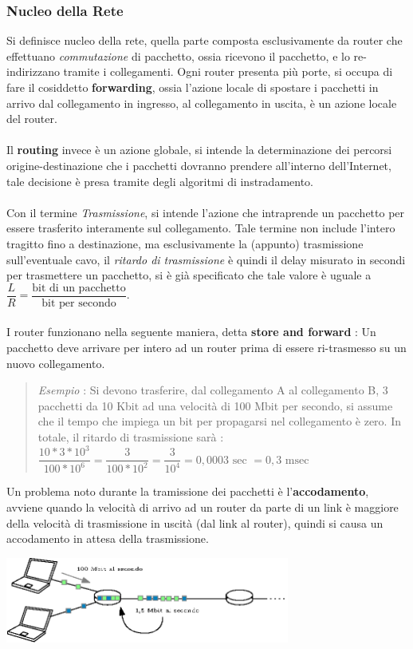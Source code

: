 \documentclass[12pt, letterpaper]{article}
\newcommand{\acc}{\\\hphantom{}\\}
\begin{document}
\subsubsection{Nucleo della Rete} \label{NucleoRete}
Si definisce nucleo della rete, quella parte composta esclusivamente da router  che effettuano \textit{commutazione} di pacchetto, ossia
ricevono il pacchetto, e lo re-indirizzano tramite i collegamenti. Ogni router presenta più porte, si occupa di fare il
cosiddetto \textbf{forwarding}, ossia l'azione locale di spostare i pacchetti in arrivo dal collegamento in ingresso, al collegamento
in uscita, è un azione locale del router.\acc
Il \textbf{routing} invece è un azione globale, si intende la determinazione dei percorsi origine-destinazione che i pacchetti
dovranno prendere all'interno dell'Internet, tale decisione è presa tramite degli algoritmi di instradamento.\acc
Con il termine \textit{Trasmissione}, si intende l'azione che intraprende un pacchetto per essere trasferito interamente
sul collegamento. Tale termine non include l'intero tragitto fino a destinazione, ma esclusivamente la (appunto) trasmissione sull'eventuale
cavo, il \textit{ritardo di trasmissione} è quindi il delay misurato in secondi per trasmettere un pacchetto, si è già specificato che tale
valore è uguale a $\dfrac{L}{R}=\dfrac{\text{bit di un pacchetto}}{\text{bit per secondo}}$.\acc
I router funzionano nella seguente maniera, detta \textbf{store and forward} : Un pacchetto deve arrivare per intero ad un router
prima di essere ri-trasmesso su un nuovo collegamento.\begin{quote}
    \color{gray} \textit{Esempio} : Si devono trasferire, dal collegamento A al collegamento B, 3 pacchetti da 10 Kbit ad una
    velocità di 100 Mbit per secondo, si assume che il  tempo che impiega un bit per propagarsi nel collegamento è zero.
    In totale, il ritardo di trasmissione sarà : $\dfrac{10*3*10^3}{100*10^6}=\dfrac{3}{100*10^2}=\dfrac{3}{10^4}=0,0003\text{ sec }=0,3\text{ msec }$
    \color{black}
\end{quote}
Un problema noto durante la tramissione dei pacchetti è l'\textbf{accodamento}, avviene quando la velocità di arrivo ad
un router da parte di un link è maggiore della velocità di trasmissione in uscità (dal link al router), quindi si causa un
accodamento in attesa della trasmissione.\begin{center}
    \includegraphics[width=0.7\textwidth ]{images/accodamento.ip.eps}
\end{center}
\end{document}
